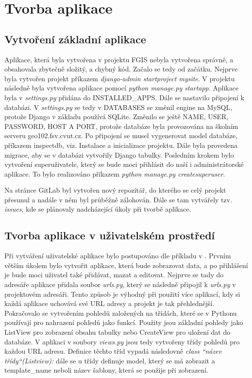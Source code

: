 \chapter{Tvorba aplikace}
\label{4-tvorba-aplikace}

\section{Vytvoření základní aplikace}

Aplikace, která byla vytvořena v projektu FGIS nebyla vytvořena
správně, a obsahovala zbytečně složitý, a chybný kód. Začalo se tedy
od začátku. Nejprve byla vytvořen projekt příkazem \emph{django-admin
  startproject mysite}. V projektu následně byla vytvořena aplikace
pomocí \emph{python manage.py startapp}. Aplikace byla v
\emph{settings.py} přidána do INSTALLED\_APPS. Dále se
nastavilo připojení k databázi. V \emph{settings.py} se tedy v
DATABASES se změnil engine na MySQL, protože Django v základu
používá SQLite. Změnilo se ještě NAME, USER, PASSWORD, HOST A PORT,
protože databáze byla provozována na školním serveru
geo102.fsv.cvut.cz. Po připojení se musel vygenerovat model databáze,
příkazem inspectdb, viz. Instalace a inicializace projektu. Dále byla
provedena migrace, aby se v databázi vytvořily Django
tabulky. Posledním krokem bylo vytvoření superuživatele, který se bude
moci přihlásit do naší i administrátorské aplikace. To bylo
realizováno příkazem \emph{python manage.py createsuperuser}.

Na stránce GitLab byl vytvořen nový repozitář, do kterého se celý
projekt přesunul a nadále v něm byl průběžně zálohován. Dále se tam
vytvářely tzv. \emph{issues}, kde se plánovaly nadcházející úkoly při
tvorbě aplikace.

\section{Tvorba aplikace v uživatelském prostředí}
Při vytváření uživatelské aplikace bylo postupováno dle příkladu v \cite{django-for-beginners}.
Prvním větším úkolem bylo vytvořit aplikace, která bude zobrazovat
data, a po přihlášení je bude moci uživatel také přidávat, mazat a
editovat. Nejprve se tady do adresáře aplikace přidala soubor  \emph{urls.py},
který se následně připojil k \emph{urls.py} v projektovém adresáři. Tento
způsob je výhodný při použití více aplikací, kdy si každá aplikace
uchovává své URL adresy a projekt je tak přehlednější. Pokračovalo se
vytvořením pohledů založených na třídách, které se v Pythonu používají
pro nahrazení pohledů jako funkcí. Použity jsou základní pohledy jako
ListView pro zobrazení obsahu tabulky nebo CreateView pro uložení dat
do databáze. V aplikaci v soubory \emph{views.py} jsou tedy vytvořeny
třídy pohledů pro každou URL adresu. Definice těchto tříd vypadá
následovně \emph{class “název třídy“(Listview):} dále se u třídy
definuje model, který se má zobrazit a template\_name neboli název
šablony, která se použije při zobrazení.

